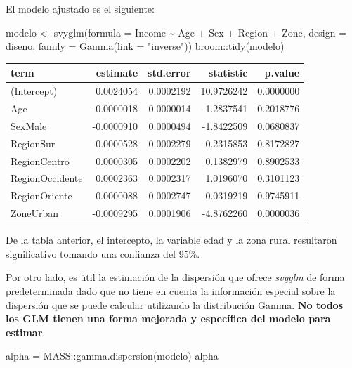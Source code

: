 \documentclass[
  12pt,
]{book}
\newenvironment{Shaded}{\begin{snugshade}}{\end{snugshade}}
\newcommand{\AttributeTok}[1]{\textcolor[rgb]{0.77,0.63,0.00}{#1}}
\newcommand{\FunctionTok}[1]{\textcolor[rgb]{0.00,0.00,0.00}{#1}}
\newcommand{\NormalTok}[1]{#1}
\newcommand{\OtherTok}[1]{\textcolor[rgb]{0.56,0.35,0.01}{#1}}
\newcommand{\SpecialCharTok}[1]{\textcolor[rgb]{0.00,0.00,0.00}{#1}}
\newcommand{\StringTok}[1]{\textcolor[rgb]{0.31,0.60,0.02}{#1}}
\begin{document}
El modelo ajustado es el siguiente:

\begin{Shaded}
\begin{Highlighting}[]
\NormalTok{modelo }\OtherTok{\textless{}{-}} \FunctionTok{svyglm}\NormalTok{(}\AttributeTok{formula =}\NormalTok{ Income }\SpecialCharTok{\textasciitilde{}}\NormalTok{ Age }\SpecialCharTok{+}\NormalTok{ Sex }\SpecialCharTok{+}
\NormalTok{                   Region }\SpecialCharTok{+}\NormalTok{ Zone,}
                   \AttributeTok{design =}\NormalTok{ diseno, }
                  \AttributeTok{family =} \FunctionTok{Gamma}\NormalTok{(}\AttributeTok{link =} \StringTok{"inverse"}\NormalTok{)) }
\NormalTok{broom}\SpecialCharTok{::}\FunctionTok{tidy}\NormalTok{(modelo)}
\end{Highlighting}
\end{Shaded}

\begin{tabular}{l|r|r|r|r}
\hline
term & estimate & std.error & statistic & p.value\\
\hline
(Intercept) & 0.0024054 & 0.0002192 & 10.9726242 & 0.0000000\\
\hline
Age & -0.0000018 & 0.0000014 & -1.2837541 & 0.2018776\\
\hline
SexMale & -0.0000910 & 0.0000494 & -1.8422509 & 0.0680837\\
\hline
RegionSur & -0.0000528 & 0.0002279 & -0.2315853 & 0.8172827\\
\hline
RegionCentro & 0.0000305 & 0.0002202 & 0.1382979 & 0.8902533\\
\hline
RegionOccidente & 0.0002363 & 0.0002317 & 1.0196070 & 0.3101123\\
\hline
RegionOriente & 0.0000088 & 0.0002747 & 0.0319219 & 0.9745911\\
\hline
ZoneUrban & -0.0009295 & 0.0001906 & -4.8762260 & 0.0000036\\
\hline
\end{tabular}

De la tabla anterior, el intercepto, la variable edad y la zona rural resultaron significativo tomando una confianza del 95\%.

Por otro lado, es útil la estimación de la dispersión que ofrece \emph{svyglm} de forma predeterminada dado que no tiene en cuenta la información especial sobre la dispersión que se puede calcular utilizando la distribución Gamma. \textbf{No todos los GLM tienen una forma mejorada y específica del modelo para estimar}.

\begin{Shaded}
\begin{Highlighting}[]
\NormalTok{alpha }\OtherTok{=}\NormalTok{ MASS}\SpecialCharTok{::}\FunctionTok{gamma.dispersion}\NormalTok{(modelo)}
\NormalTok{alpha}
\end{Highlighting}
\end{Shaded}
\end{document}
